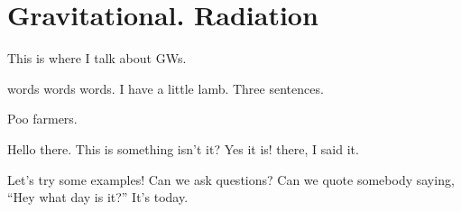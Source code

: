 

\chapter{Gravitational. Radiation}
This is where I talk about GWs.

words words words. %
I have a little lamb. %
Three sentences.

Poo farmers. %

Hello there. This is something isn't it? Yes it is! there, I said it. %

Let's try some examples! %
Can we ask questions? %
Can we quote somebody saying, ``Hey what day is it?'' %
It's today.


